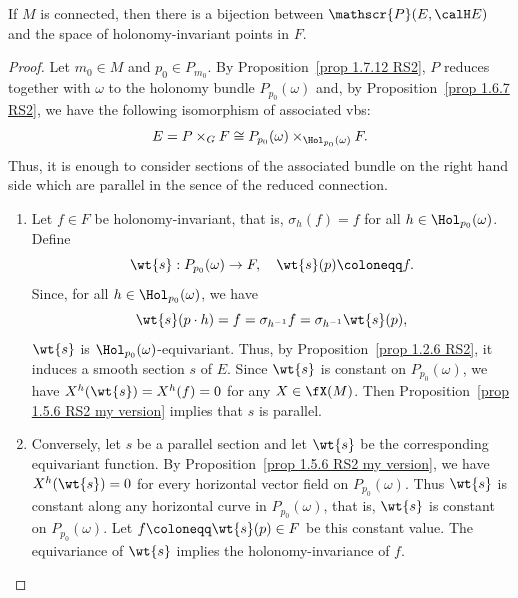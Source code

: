 \begin{prop}\label{prop 1.7.20 RS2 holonomy principle}
    If $M$ is connected, then there is a bijection between $\mathscr{P}(E,\calH E)$ and the space of holonomy-invariant points in $F$.
\end{prop}
\begin{proof}
    Let $m_0\in M$ and $p_0\in P_{m_0}$. By Proposition~\ref{prop 1.7.12 RS2}, $P$ reduces together with $\omega$ to the holonomy bundle $P_{p_0}(\omega)$ and, by Proposition~\ref{prop 1.6.7 RS2}, we have the following isomorphism of associated \glspl{vb}:
    \[E=P\times_G F\cong P_{p_0}(\omega)\times_{\Hol_{p_0}(\omega)}F.\]
    Thus, it is enough to consider sections of the associated bundle on the right hand side which are parallel in the sence of the reduced connection.
    \begin{enumerate}
        \item Let $f\in F$ be holonomy-invariant, that is, $\sigma_h(f)=f$ for all $h\in\Hol_{p_0}(\omega)$. Define
        \[\wt{s}:P_{p_0}(\omega)\to F,\quad \wt{s}(p)\coloneqq f.\]
        Since, for all $h\in \Hol_{p_0}(\omega)$, we have
        \[\wt{s}(p\cdot h)=f=\sigma_{h^{-1}}f=\sigma_{h^{-1}}\wt{s}(p),\]
        $\wt{s}$ is $\Hol_{p_0}(\omega)$-equivariant. Thus, by Proposition~\ref{prop 1.2.6 RS2}, it induces a smooth section $s$ of $E$. Since $\wt{s}$ is constant on $P_{p_0}(\omega)$, we have $X^h(\wt{s})=X^h(f)=0$ for any $X\in\fX(M)$. Then Proposition~\ref{prop 1.5.6 RS2 my version} implies that $s$ is parallel.
        \item Conversely, let $s$ be a parallel section and let $\wt{s}$ be the corresponding equivariant function. By Proposition~\ref{prop 1.5.6 RS2 my version}, we have $X^h(\wt{s})=0$ for every horizontal vector field on $P_{p_0}(\omega)$. Thus $\wt{s}$ is constant along any horizontal curve in $P_{p_0}(\omega)$, that is, $\wt{s}$ is constant on $P_{p_0}(\omega)$. Let $f\coloneqq \wt{s}(p)\in F$ be this constant value. The equivariance of $\wt{s}$ implies the holonomy-invariance of $f$.
    \end{enumerate}
\end{proof}





